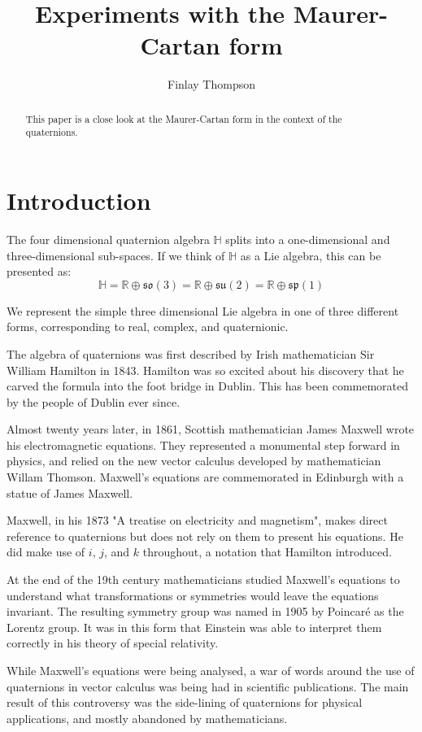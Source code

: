 \documentclass{amsart}
\title{Experiments with the Maurer-Cartan form}
\author{Finlay Thompson}
\newcommand{\HH}{\mathbb{H}}
\newcommand{\RR}{\mathbb{R}}
\newcommand{\so}{\mathfrak{so}}
\newcommand{\su}{\mathfrak{su}}
\renewcommand{\sp}{\mathfrak{sp}}
\begin{document}
\begin{abstract}
  This paper is a close look at the Maurer-Cartan form in the context of the quaternions.
\end{abstract}

\maketitle

\section{Introduction}

The four dimensional quaternion algebra $\HH$ splits into a one-dimensional and three-dimensional sub-spaces.
If we think of $\HH$ as a Lie algebra, this can be presented as:
$$\HH = \RR \oplus \so(3) = \RR \oplus \su(2) = \RR \oplus \sp(1) $$

We represent the simple three dimensional Lie algebra in one of three different forms, corresponding to real, complex, and quaternionic.

The algebra of quaternions was first described by Irish mathematician Sir William Hamilton in 1843.
Hamilton was so excited about his discovery that he carved the formula into the foot bridge in Dublin.
This has been commemorated by the people of Dublin ever since.

Almost twenty years later, in 1861, Scottish mathematician James Maxwell wrote his electromagnetic equations.
They represented a monumental step forward in physics, and relied on the new vector calculus developed by mathematician Willam Thomson.
Maxwell's equations are commemorated in Edinburgh with a statue of James Maxwell.

Maxwell, in his 1873 "A treatise on electricity and magnetism", makes direct reference to quaternions but does not rely on them to present his equations.
He did make use of $i$, $j$, and $k$ throughout, a notation that Hamilton introduced.

At the end of the 19th century mathematicians studied Maxwell's equations to understand what transformations or symmetries would leave the equations invariant.
The resulting symmetry group was named in 1905 by Poincaré as the Lorentz group.
It was in this form that Einstein was able to interpret them correctly in his theory of special relativity.

While Maxwell's equations were being analysed, a war of words around the use of quaternions in vector calculus was being had in scientific publications.
The main result of this controversy was the side-lining of quaternions for physical applications, and mostly abandoned by mathematicians.
\end{document}
